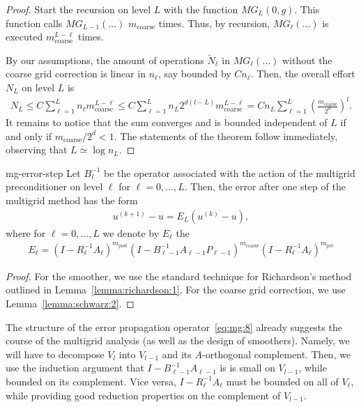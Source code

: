 \begin{proof}
  Start the recursion on level $L$ with the function $MG_L(0,
  g)$. This function calls $MG_{L-1}(\ldots)$ $m_{\text{coarse}}$
  times. Thus, by recursion, $MG_{\ell}(\ldots)$ is executed
  $m_{\text{coarse}}^{L-\ell}$ times.
  
  By our assumptions, the amount of operations $\breve N_\ell$ in $MG_\ell(\ldots)$
  without the coarse grid correction is linear in $n_\ell$, say
  bounded by $Cn_\ell$. Then, the overall effort $N_L$ on level $L$ is
  \begin{gather}
    \label{eq:mg:6}
    N_L \le C \sum_{\ell=1}^L n_\ell m_{\text{coarse}}^{L-\ell} \le C
    \sum_{\ell=1}^L n_L 2^{d(l-L)}m_{\text{coarse}}^{L-\ell}
    = C n_L \sum_{\ell=1}^L \left(\frac{m_{\text{coarse}}}{2^d}\right)^l.
  \end{gather}
  It remains to notice that the sum converges and is bounded
  independent of $L$ if and only if $m_{\text{coarse}}/2^d < 1$. The
  statements of the theorem follow immediately, observing that $L
  \simeq \log n_L$.
\end{proof}

\begin{Lemma}{mg-error-step}
  Let $B_\ell^{-1}$ be the operator associated with the action of the
  multigrid preconditioner on level $\ell$ for
  $\ell=0,\ldots,L$. Then, the error after one step of the multigrid
  method has the form
  \begin{gather}
    \label{eq:mg:7}
    u^{(k+1)} - u = E_L \left(u^{(k)} - u \right),
  \end{gather}
  where for $\ell=0,\ldots,L$ we denote by $E_\ell$ the
  \begin{gather}
    \label{eq:mg:8}
    E_\ell = \left(I-R_\ell^{-1} A_\ell\right)^{m_{\text{post}}}
    \left(I-B_{\ell-1}^{-1}A_{\ell-1} P_{\ell-1}\right)^{m_{\text{coarse}}}
     \left(I-R_\ell^{-1} A_\ell\right)^{m_{\text{pre}}}
  \end{gather}
\end{Lemma}

\begin{proof}
  For the smoother, we use the standard technique for Richardson's
  method outlined in Lemma~\ref{lemma:richardson:1}. For the coarse
  grid correction, we use Lemma~\ref{lemma:schwarz:2}.
\end{proof}

\begin{note}
  The structure of the error propagation operator~\eqref{eq:mg:8}
  already suggests the course of the multigrid analysis (as well as
  the design of smoothers). Namely, we will have to decompose $V_l$
  into $V_{l-1}$ and its $A$-orthogonal complement. Then, we use the
  induction argument that $I-B_{\ell-1}^{-1}A_{\ell-1}$ is is small on
  $V_{l-1}$, while bounded on its complement. Vice versa,
  $I-R_\ell^{-1} A_\ell$ must be bounded on all of $V_\ell$, while
  providing good reduction properties on the complement of $V_{l-1}$.
\end{note}

